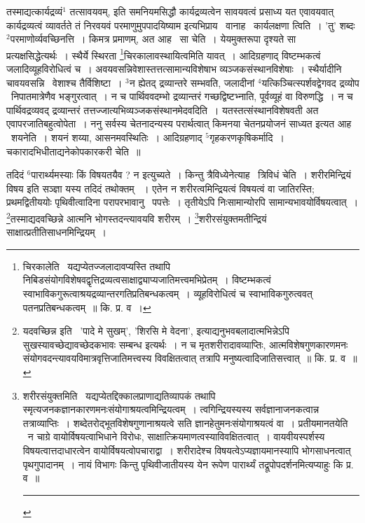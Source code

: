 \documentclass[11pt, openany]{book}
\begin{document}
\newpage
तस्माद्यत्कार्यद्रव्यं$^1$ तत्सावयवम्, इति समनियमसिद्धौ कार्यद्रव्यत्वेन सावयवत्वं प्रसाध्य यत एवावयवात् कार्यद्रव्यत्वं व्यावर्तते तं निरवयवं परमाणुमुपपादयिष्याम इत्यभिप्राय \textendash\ वानाह \textendash\ {\knu कार्यलक्षणा त्वि}ति~। 'तु' शब्दः ${}^2$परमाणोर्व्यवच्छिनत्ति~। किमत्र प्रमाणम्, अत आह \textendash\ {\knu सा चे}ति~। येयमुक्तरूपा दृश्यते सा प्रत्यक्षसिद्धेत्यर्थः~। स्थैर्ये स्थिरता \renewcommand{\thefootnote}{१}\footnote{चिरकालेति \textendash\ यद्यप्येतज्जलादावप्यस्ति तथापि निबिडसंयोगविशेषवद्वृत्तिद्रव्यत्वसाक्षाद्व्याप्यजातिमत्त्वमभिप्रेतम्~। विष्टम्भकत्वं स्वाभाविकगुरूत्वाश्रयद्रव्यान्तरगतिप्रतिबन्धकत्वम्~। व्यूहविरोधित्वं च स्वाभाविकगुरुत्ववत् पतनप्रतिबन्धकत्वम्~॥ कि. प्र. व~।}चिरकालावस्थायित्वमिति यावत्~। आदिग्रहणाद् विष्टम्भकत्वं जलादिव्यूहविरोधित्वं च~। अवयवसन्निवेशास्तत्तत्सामान्यविशेषाभ व्यञ्जकसंस्थानविशेषाः~। स्थैर्यादीनि चावयवसन्नि \textendash\ वेशाश्च तैर्विशिष्टा~। ${}^3$न ह्येतद् द्रव्यान्तरे सम्भवति, जलादीनां ${}^4$यत्किञ्चित्स्पर्शवद्वेगवद द्रव्योप \textendash\ निपातमात्रेणैव भङ्गुरत्वात्~। न च पार्थिववदम्भो द्रव्यान्तरं गच्छद्विष्टभ्नाति, पूर्वव्यूहं वा विरुणद्धि~। न च पार्थिवद्रव्यवद् द्रव्यान्तरं तत्तज्जात्यभिव्यञ्जकसंस्थानमेदवदिति~। यतस्तत्संस्थानविशेषवती अत एवापरजातिबहुत्वोपेता~। ननु सर्वस्य चेतनादन्यस्य परार्थत्वात् किमनया चेतनप्रयोजनं साध्यत इत्यत आह \textendash\ {\knu शयनेति~।} शयनं शय्या, आसनमवस्थितिः~। आदिग्रहणाद् ${}^5$गृहकरणकृषिकर्मादि~। चकारादभिधीताद्यनेकोपकारकरी चेति~॥

तदिदं ${}^6$पारार्थ्यमस्याः किं विषयतयैव ? न इत्युच्यते~। किन्तु त्रैविध्येनेत्याह \textendash\ त्रिविधं चेति~। शरीरमिन्द्रियं विषय इति सञ्ज्ञा यस्य तदिदं तथोक्तम् ~। एतेन न शरीरत्वमिन्द्रियत्वं विषयत्वं वा जातिरस्ति; प्रथमद्वितीययोः पृथिवीत्वादिना परापरभावानु \textendash\ पपत्तेः~। तृतीयेऽपि निःसामान्योरपि सामान्यभावयोर्विषयत्वात्~। \renewcommand{\thefootnote}{२}\footnote{यदवच्छिन्न इति \textendash\ 'पादे मे सुखम्', 'शिरसि मे वेदना', इत्याद्यनुभवबलादात्मभिन्नेऽपि सुखस्यावच्छेद्यावच्छेदकभावः सम्बन्ध इत्यर्थः~। न च मृतशरीरादावव्याप्तिः, आत्मविशेषगुणकारणमनः संयोगवदन्त्यावयविमात्रवृत्तिजातिमत्त्वस्य विवक्षितत्वात् तत्रापि मनुष्यत्वादिजातिसत्त्वात्~॥ कि. प्र. व~॥}तस्माद्यदवच्छिन्ने आत्मनि भोगस्तदन्त्यावयवि शरीरम्~। \renewcommand{\thefootnote}{३}\footnote{शरीरसंयुक्तमिति \textendash\ यद्यप्येतद्दिक्कालप्राणाद्यतिव्यापकं तथापि स्मृत्यजनकज्ञानकारणमनःसंयोगाश्रयत्वमिन्द्रियत्वम्~। त्वगिन्द्रियस्यस्य सर्वज्ञानाजनकत्वान्न तत्राव्याप्तिः~। शब्देतरोद्भूतविशेषगुणानाश्रयत्वे सति ज्ञानहेतुमनःसंयोगाश्रयत्वं वा~। प्रतीयमानतयेति \textendash\ न चाग्रे वायोर्विषयत्वाभिधाने विरोधः, साक्षात्क्रियमाणत्वस्याविवक्षितत्वात्~। वायवीयस्पर्शस्य विषयत्वात्तदाधारत्वेन वायोर्विषयत्वोपचाराद्वा~। शरीरादेश्च विषयत्वेऽप्यज्ञायमानस्यापि भोगसाधनत्वात् पृथगुपादानम्~। नायं विभागः किन्तु पृथिवीजातीयस्य येन रूपेण पारार्थ्यं तद्रूपोपदर्शनमित्यप्याहुः कि प्र. व~॥\\ \rule{0.4\linewidth}{0.5pt}}शरीरसंयुक्तमतीन्द्रियं साक्षात्प्रतीतिसाधनमिन्द्रियम्~।
\end{document}
